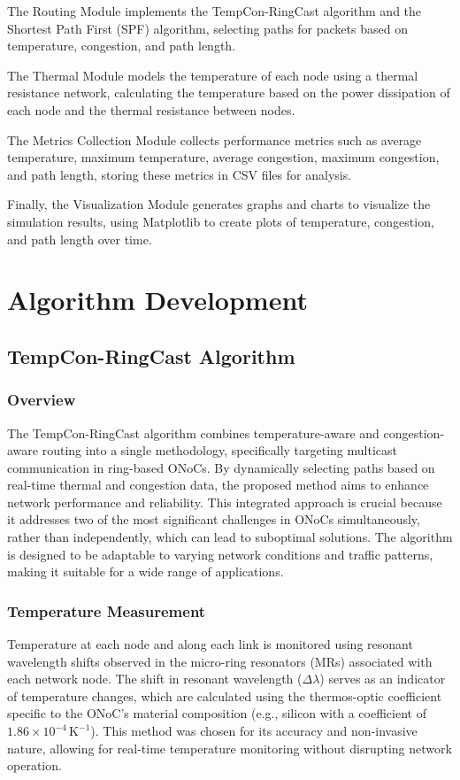 \documentclass[12pt]{article}
\begin{document}
The Routing Module implements the TempCon-RingCast algorithm and the Shortest Path First (SPF) algorithm, selecting paths for packets based on temperature, congestion, and path length.

The Thermal Module models the temperature of each node using a thermal resistance network, calculating the temperature based on the power dissipation of each node and the thermal resistance between nodes.

The Metrics Collection Module collects performance metrics such as average temperature, maximum temperature, average congestion, maximum congestion, and path length, storing these metrics in CSV files for analysis.

Finally, the Visualization Module generates graphs and charts to visualize the simulation results, using Matplotlib to create plots of temperature, congestion, and path length over time.

\newpage

\chapter{Algorithm Development}

\section{TempCon-RingCast Algorithm}
\subsection{Overview}
The TempCon-RingCast algorithm combines temperature-aware and congestion-aware routing into a single methodology, specifically targeting multicast communication in ring-based ONoCs. By dynamically selecting paths based on real-time thermal and congestion data, the proposed method aims to enhance network performance and reliability. This integrated approach is crucial because it addresses two of the most significant challenges in ONoCs simultaneously, rather than independently, which can lead to suboptimal solutions. The algorithm is designed to be adaptable to varying network conditions and traffic patterns, making it suitable for a wide range of applications.

\subsection{Temperature Measurement}
Temperature at each node and along each link is monitored using resonant wavelength shifts observed in the micro-ring resonators (MRs) associated with each network node. The shift in resonant wavelength (\(\Delta \lambda\)) serves as an indicator of temperature changes, which are calculated using the thermos-optic coefficient specific to the ONoC's material composition (e.g., silicon with a coefficient of \(1.86 \times 10^{-4} \, \mathrm{K}^{-1}\)). This method was chosen for its accuracy and non-invasive nature, allowing for real-time temperature monitoring without disrupting network operation.
\end{document}
